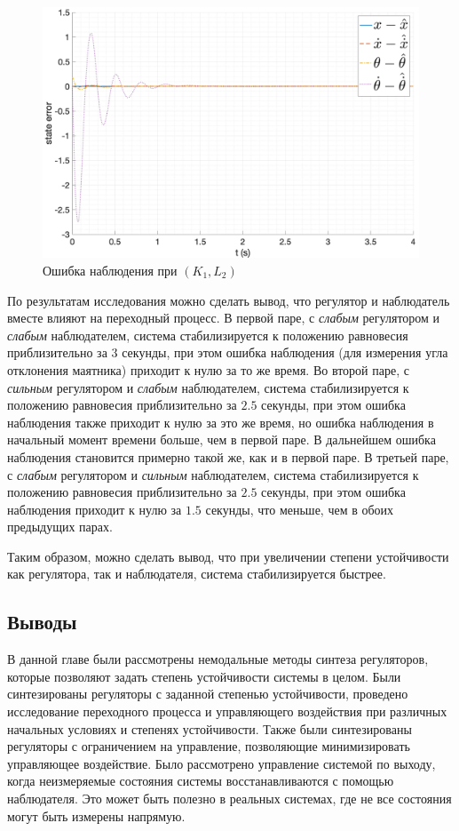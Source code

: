 \begin{figure}[ht!]
    \centering
    \includegraphics[width=\textwidth]{media/plots/nonmodal_observer_controller/kl_err_3.png}
    \caption{Ошибка наблюдения при $(K_1, L_2)$}
    \label{fig:KL_3_err}
\end{figure}

\FloatBarrier
По результатам исследования можно сделать вывод, что регулятор и наблюдатель вместе влияют на переходный процесс.
В первой паре, с \textit{слабым} регулятором и \textit{слабым} наблюдателем, система стабилизируется к положению равновесия
приблизительно за $3$ секунды, при этом ошибка наблюдения (для измерения угла отклонения маятника) приходит к нулю
за то же время. Во второй паре, с \textit{сильным} регулятором и \textit{слабым} наблюдателем, система стабилизируется
к положению равновесия приблизительно за $2.5$ секунды, при этом ошибка наблюдения также приходит к нулю за это же время, 
но ошибка наблюдения в начальный момент времени больше, чем в первой паре. В дальнейшем ошибка наблюдения становится 
примерно такой же, как и в первой паре. В третьей паре, с \textit{слабым} регулятором и \textit{сильным} наблюдателем,
система стабилизируется к положению равновесия приблизительно за $2.5$ секунды, при этом ошибка наблюдения
приходит к нулю за $1.5$ секунды, что меньше, чем в обоих предыдущих парах. 

Таким образом, можно сделать вывод, что при увеличении степени устойчивости как регулятора, так и наблюдателя,
система стабилизируется быстрее.

\subsection{Выводы}
В данной главе были рассмотрены немодальные методы синтеза регуляторов, которые позволяют задать степень устойчивости системы в целом.
Были синтезированы регуляторы с заданной степенью устойчивости, проведено исследование переходного процесса и управляющего воздействия при различных начальных условиях и степенях устойчивости.
Также были синтезированы регуляторы с ограничением на управление, позволяющие минимизировать управляющее воздействие.
Было рассмотрено управление системой по выходу, когда неизмеряемые состояния системы восстанавливаются с помощью наблюдателя. 
Это может быть полезно в реальных системах, где не все состояния могут быть измерены напрямую. 
